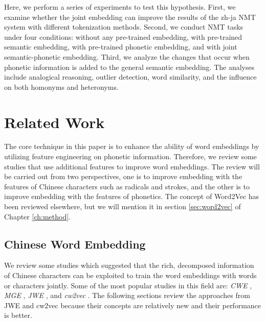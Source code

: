 Here, we perform a series of experiments to test this hypothesis. First, we examine whether the joint embedding can improve the results of the zh-ja NMT system with different tokenization methods. Second, we conduct NMT tasks under four conditions: without any pre-trained embedding, with pre-trained semantic embedding, with pre-trained phonetic embedding, and with joint semantic-phonetic embedding. Third, we analyze the changes that occur when phonetic information is added to the general semantic embedding. The analyses include analogical reasoning, outlier detection, word similarity, and the influence on both homonyms and heteronyms.

\section{Related Work} \label{sec:related_work}

The core technique in this paper is to enhance the ability of word embeddings by utilizing feature engineering on phonetic information. Therefore, we review some studies that use additional features to improve word embeddings. The review will be carried out from two perspectives, one is to improve embedding with the features of Chinese characters such as radicals and strokes, and the other is to improve embedding with the features of phonetics. The concept of Word2Vec \cite{mikolov2013efficient} has been reviewed elsewhere, but we will mention it in section \ref{sec:word2vec} of Chapter \ref{ch:method}.

\subsection{Chinese Word Embedding} \label{sec:rw_cwe}

We review some studies which suggested that the rich, decomposed information of Chinese characters can be exploited to train the word embeddings with words or characters jointly. Some of the most popular studies in this field are: \textit{CWE} \cite{chen2015joint}, \textit{MGE} \cite{yin2016multi}, \textit{JWE} \cite{yu2017joint}, and \textit{cw2vec} \cite{cao2018cw2vec}. The following sections review the approaches from JWE and cw2vec because their concepts are relatively new and their performance is better.

